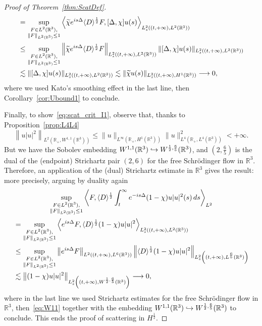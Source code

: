 \documentclass[AHL,Unicode,longabstracts,published]{cedram}
\newcommand*\R{\mathbb{R}}
\renewcommand*{\to}{\mathchoice{\longrightarrow}{\rightarrow}{\rightarrow}{\rightarrow}}
\newcommand{\longhookrightarrow}{\lhook\joinrel\longrightarrow}
\newcommand*{\hookto}{\mathchoice{\longhookrightarrow}{\hookrightarrow}{\hookrightarrow}{\hookrightarrow}}
\begin{document}
\begin{proof}[Proof of Theorem~\ref{thm:ScatDef}]
\begin{multline*}
\begin{aligned}
&= \sup_{\substack{F \in L^2(\R^3), \\ \| F \|_{L^2(\R^3)} \leq 1}} \left\langle \widetilde \chi e^{is\Delta}\langle D \rangle^{\frac 12} F, [\Delta, \chi] u(s) \right\rangle_{L_s^2((t, +\infty), L^2(\R^3))} \\
&\leq \sup_{\substack{F \in L^2(\R^3), \\ \| F \|_{L^2(\R^3)} \leq 1}} \left\| \widetilde \chi e^{is\Delta}\langle D \rangle^{\frac 12} F \right\|_{L_s^2\left((t, +\infty), L^2(\R^3)\right)} \| [\Delta, \chi] u(s) \| _{L_s^2\left((t, +\infty), L^2(\R^3)\right)} \\
&\lesssim \| [\Delta, \chi] u(s) \|_{L_s^2((t, +\infty), L^2(\R^3))} \lesssim \| \widetilde \chi u(s)\|_{L_s^2((t, +\infty),H^1(\R^3))} \to 0,
\end{aligned}
\end{multline*}
where we used Kato's smoothing effect in the last line, then Corollary~\ref{cor:Ubound1} to conclude.

Finally, to show~\eqref{eq:scat_crit_I1}, observe that, thanks to Proposition~\ref{prop:L4L4}
\begin{equation}\label{eq:W11}
\left\| u|u|^2 \right\|_{L^2\left(\R_+, W^{1, 1}(\R^3)\right)} \leq \| u \|_{L^\infty\left(\R_+, H^1(\R^3)\right)} \| u \|^2_{L^4(\R_+, L^4(\R^3))} < +\infty.
\end{equation}
But we have the Sobolev embedding $W^{1, 1} (\R^3)\hookto W^{\frac 12, \frac {6}{5}}(\R^3)$, and $(2, \frac {6}{5})$ is the dual of the (endpoint) Strichartz pair $(2, 6)$ for the free Schr{\"o}dinger flow in $\R^3$. Therefore, an application of the (dual) Strichartz estimate in $\R^3$ gives the result: more precisely, arguing by duality again
\begin{multline*}
\sup_{\substack{F \in L^2(\R^3), \\ \| F \|_{L^2(\R^3)} \leq 1}} \left\langle F, \langle D \rangle^{\frac 12} \int_t^\infty e^{-is\Delta} (1-\chi)u|u|^{2}(s) \, ds \right\rangle_{L^2} \\
\begin{aligned}
&= \sup_{\substack{F \in L^2(\R^3), \\ \| F \|_{L^2(\R^3)} \leq 1}} \left\langle e^{is\Delta} F, \langle D \rangle^{\frac 12}(1-\chi)u|u|^{2} \right\rangle_{L_s^2((t, +\infty), L^2(\R^3))} \\
&\leq \sup_{\substack{F \in L^2(\R^3), \\ \| F \|_{L^2(\R^3)} \leq 1}} \left\| e^{is\Delta} F\right\|_{L^2((t, +\infty), L^6(\R^3))} \left\| \langle D \rangle^{\frac 12} (1-\chi)u|u|^{2}\right\|_{L_s^2\left((t, +\infty), L^{\frac 65}(\R^3)\right)} \\
&\lesssim \left\| (1-\chi)u|u|^{2}\right\| _{L_s^2\left((t, +\infty), W^{\frac 12, \frac 65}(\R^3)\right)} \to 0,
\end{aligned}
\end{multline*}
where in the last line we used Strichartz estimates for the free Schr{\"o}dinger flow in $\R^3$, then~\eqref{eq:W11} together with the embedding $W^{1, 1}(\R^3) \hookto W^{\frac 12, \frac {6}{5}}(\R^3)$ to conclude. This ends the proof of scattering in $H^{\frac 12}$.


\end{proof}
\end{document}
